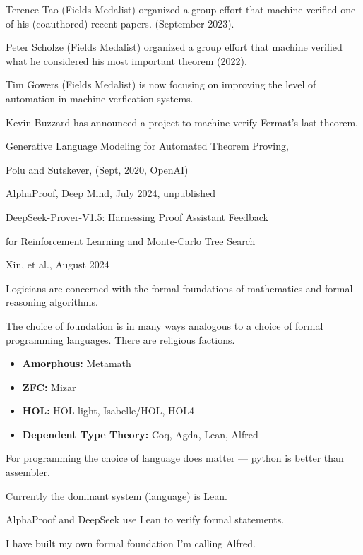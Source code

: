 {

Terence Tao (Fields Medalist) organized a group effort that machine verified one of his (coauthored) recent papers. (September 2023).

\vfill
Peter Scholze (Fields Medalist) organized a group effort that machine verified what he considered his most important theorem (2022).

\vfill
Tim Gowers (Fields Medalist) is now focusing on improving the level of automation in machine verfication systems.

\vfill
Kevin Buzzard has announced a project to machine verify Fermat's last theorem.


\vfill
\centerline{Generative Language Modeling for Automated Theorem Proving,}
\centerline{Polu and Sutskever, (Sept, 2020, OpenAI)}

\vfill
AlphaProof, Deep Mind, July 2024, unpublished

\vfill
\centerline{DeepSeek-Prover-V1.5: Harnessing Proof Assistant Feedback}
\centerline{for Reinforcement Learning and Monte-Carlo Tree Search}
\centerline{Xin, et al., August 2024}


Logicians are concerned with the formal foundations of mathematics and formal reasoning algorithms.

\vfill
The choice of foundation is in many ways analogous to a choice of formal programming languages.  There are religious factions.

\vfill
\begin{itemize}
\item {\bf Amorphous:} Metamath
\item {\bf ZFC:} Mizar
\item {\bf HOL:} HOL light, Isabelle/HOL, HOL4
\item {\bf Dependent Type Theory:} Coq, Agda, Lean, Alfred
\end{itemize}

\vfill
For programming the choice of language does matter --- python is better than assembler.

Currently the dominant system (language) is Lean.

\vfill
AlphaProof and DeepSeek use Lean to verify formal statements.

\vfill
I have built my own formal foundation I'm calling Alfred.

}
